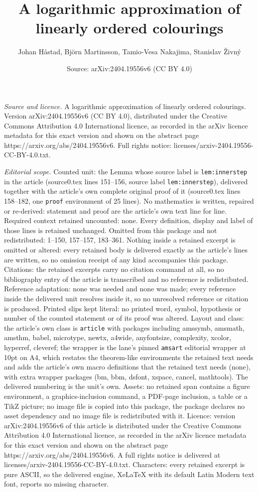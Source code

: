 \documentclass[10pt,a4paper]{amsart}
\title[A logarithmic approximation of linearly ordered colourings]{A logarithmic approximation of linearly ordered colourings}
\author{Johan H{\aa}stad, Bj\"orn Martinsson, Tamio-Vesa Nakajima, Stanislav \v{Z}ivn\'y}
\date{Source: arXiv:2404.19556v6 (CC BY 4.0)}
\begin{document}
\maketitle

\noindent\emph{Source and licence.} A logarithmic approximation of linearly ordered colourings. Version arXiv:2404.19556v6 (CC BY 4.0), distributed under the Creative Commons Attribution 4.0 International licence, as recorded in the arXiv licence metadata for this exact version and shown on the abstract page https://arxiv.org/abs/2404.19556v6. Full rights notice: licenses/arxiv-2404.19556-CC-BY-4.0.txt.\par\smallskip

\noindent\textit{Editorial scope.} Counted unit: the Lemma whose source label is \texttt{lem:innerstep} in the article (source0.tex lines 151--156, source label \texttt{lem:innerstep}), delivered together with the article's own complete original proof of it (source0.tex lines 158--182, one \texttt{proof} environment of 25 lines). No mathematics is written, repaired or re-derived: statement and proof are the article's own text line for line. Required context retained uncounted: none. Every definition, display and label of those lines is retained unchanged. Omitted from this package and not redistributed: 1--150, 157--157, 183--361. Nothing inside a retained excerpt is omitted or altered: every retained body is delivered exactly as the article's lines are written, so no omission receipt of any kind accompanies this package. Citations: the retained excerpts carry no citation command at all, so no bibliography entry of the article is transcribed and no reference is redistributed. Reference adaptation: none was needed and none was made; every reference inside the delivered unit resolves inside it, so no unresolved reference or citation is produced. Printed slips kept literal: no printed word, symbol, hypothesis or number of the counted statement or of its proof was altered. Layout and class: the article's own class is \texttt{article} with packages including amssymb, amsmath, amsthm, babel, microtype, newtx, a4wide, anyfontsize, complexity, xcolor, hyperref, cleveref; the wrapper is the lane's pinned \texttt{amsart} editorial wrapper at 10pt on A4, which restates the theorem-like environments the retained text needs and adds the article's own macro definitions that the retained text needs (none), with extra wrapper packages (bm, bbm, dsfont, xspace, cancel, mathtools). The delivered numbering is the unit's own. Assets: no retained span contains a figure environment, a graphics-inclusion command, a PDF-page inclusion, a table or a TikZ picture; no image file is copied into this package, the package declares no asset dependency and no image file is redistributed with it. Licence: version arXiv:2404.19556v6 of this article is distributed under the Creative Commons Attribution 4.0 International licence, as recorded in the arXiv licence metadata for this exact version and shown on the abstract page https://arxiv.org/abs/2404.19556v6. A full rights notice is delivered at licenses/arxiv-2404.19556-CC-BY-4.0.txt. Characters: every retained excerpt is pure ASCII, so the delivered engine, XeLaTeX with its default Latin Modern text font, reports no missing character.
\end{document}
